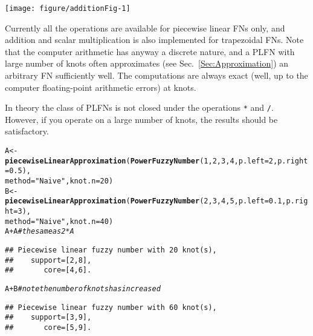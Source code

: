 \documentclass[11pt]{article}\usepackage[]{graphicx}\usepackage[]{color}
\makeatletter
\newcommand{\hlnum}[1]{\textcolor[rgb]{0.686,0.059,0.569}{#1}}%
\newcommand{\hlstr}[1]{\textcolor[rgb]{0.192,0.494,0.8}{#1}}%
\newcommand{\hlcom}[1]{\textcolor[rgb]{0.678,0.584,0.686}{\textit{#1}}}%
\newcommand{\hlopt}[1]{\textcolor[rgb]{0,0,0}{#1}}%
\newcommand{\hlstd}[1]{\textcolor[rgb]{0.345,0.345,0.345}{#1}}%
\newcommand{\hlkwb}[1]{\textcolor[rgb]{0.69,0.353,0.396}{#1}}%
\newcommand{\hlkwc}[1]{\textcolor[rgb]{0.333,0.667,0.333}{#1}}%
\newcommand{\hlkwd}[1]{\textcolor[rgb]{0.737,0.353,0.396}{\textbf{#1}}}%
\newenvironment{kframe}{%
 \def\at@end@of@kframe{}%
 \ifinner\ifhmode%
  \def\at@end@of@kframe{\end{minipage}}%
  \begin{minipage}{\columnwidth}%
 \fi\fi%
 \def\FrameCommand##1{\hskip\@totalleftmargin \hskip-\fboxsep
 \colorbox{shadecolor}{##1}\hskip-\fboxsep
     \hskip-\linewidth \hskip-\@totalleftmargin \hskip\columnwidth}%
 \MakeFramed {\advance\hsize-\width
   \@totalleftmargin\z@ \linewidth\hsize
   \@setminipage}}%
 {\par\unskip\endMakeFramed%
 \at@end@of@kframe}
\newenvironment{knitrout}{}{} %
\makeatother
\begin{document}
\begin{center}
\begin{knitrout}\small
{}\color{fgcolor}

{\centering \texttt{[image: figure/additionFig-1]} 

}



\end{knitrout}
\end{center}


Currently all the operations are available
for piecewise linear FNs only,
and addition and scalar multiplication
is also implemented for trapezoidal FNs.
Note that the computer arithmetic has anyway
a discrete nature, and a PLFN with large number
of knots often approximates (see Sec.~\ref{Sec:Approximation})
an arbitrary FN sufficiently well.
The computations are always exact (well, up to the computer
floating-point arithmetic errors) at knots.

In theory the class of PLFNs is not closed
under the operations \texttt{*} and \texttt{/}.
However, if you operate on a large number of knots,
the results should be satisfactory.



\begin{knitrout}\small
{}\color{fgcolor}\begin{kframe}
\begin{alltt}
\hlstd{A} \hlkwb{<-} \hlkwd{piecewiseLinearApproximation}\hlstd{(}\hlkwd{PowerFuzzyNumber}\hlstd{(}\hlnum{1}\hlstd{,}\hlnum{2}\hlstd{,}\hlnum{3}\hlstd{,}\hlnum{4}\hlstd{,}\hlkwc{p.left}\hlstd{=}\hlnum{2}\hlstd{,}\hlkwc{p.right}\hlstd{=}\hlnum{0.5}\hlstd{),}
   \hlkwc{method}\hlstd{=}\hlstr{"Naive"}\hlstd{,} \hlkwc{knot.n}\hlstd{=}\hlnum{20}\hlstd{)}
\hlstd{B} \hlkwb{<-} \hlkwd{piecewiseLinearApproximation}\hlstd{(}\hlkwd{PowerFuzzyNumber}\hlstd{(}\hlnum{2}\hlstd{,}\hlnum{3}\hlstd{,}\hlnum{4}\hlstd{,}\hlnum{5}\hlstd{,}\hlkwc{p.left}\hlstd{=}\hlnum{0.1}\hlstd{,}\hlkwc{p.right}\hlstd{=}\hlnum{3}\hlstd{),}
   \hlkwc{method}\hlstd{=}\hlstr{"Naive"}\hlstd{,} \hlkwc{knot.n}\hlstd{=}\hlnum{40}\hlstd{)}
\hlstd{A}\hlopt{+}\hlstd{A} \hlcom{# the same as 2*A}
\end{alltt}
\begin{verbatim}
## Piecewise linear fuzzy number with 20 knot(s),
##    support=[2,8],
##       core=[4,6].
\end{verbatim}
\begin{alltt}
\hlstd{A}\hlopt{+}\hlstd{B} \hlcom{# note the number of knots has increased}
\end{alltt}
\begin{verbatim}
## Piecewise linear fuzzy number with 60 knot(s),
##    support=[3,9],
##       core=[5,9].
\end{verbatim}
\end{kframe}
\end{knitrout}
\end{document}
